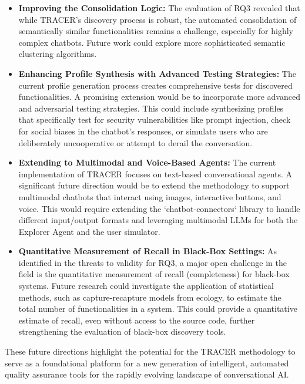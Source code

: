\begin{itemize}
    \item \textbf{Improving the Consolidation Logic:}
      The evaluation of RQ3 revealed that while TRACER's discovery process is robust,
      the automated consolidation of semantically similar functionalities remains a challenge,
      especially for highly complex chatbots.
      Future work could explore more sophisticated semantic clustering algorithms. 

    \item \textbf{Enhancing Profile Synthesis with Advanced Testing Strategies:}
      The current profile generation process creates comprehensive tests for discovered functionalities.
      A promising extension would be to incorporate more advanced and adversarial testing strategies.
      This could include synthesizing profiles that specifically test for security vulnerabilities like prompt injection,
      check for social biases in the chatbot's responses,
      or simulate users who are deliberately uncooperative or attempt to derail the conversation.

    \item \textbf{Extending to Multimodal and Voice-Based Agents:}
      The current implementation of \ac{TRACER} focuses on text-based conversational agents.
      A significant future direction would be
      to extend the methodology to support multimodal chatbots that interact using images, interactive buttons, and voice.
      This would require extending the `chatbot-connectors` library
      to handle different input/output formats
      and leveraging multimodal \acp{LLM} for both the Explorer Agent and the user simulator.

    \item \textbf{Quantitative Measurement of Recall in Black-Box Settings:}
      As identified in the threats to validity for RQ3,
      a major open challenge in the field is the quantitative measurement of recall (completeness) for black-box systems.
      Future research could investigate the application of statistical methods,
      such as capture-recapture models from ecology,
      to estimate the total number of functionalities in a system.
      This could provide a quantitative estimate of recall,
      even without access to the source code,
      further strengthening the evaluation of black-box discovery tools.
\end{itemize}

These future directions highlight the potential for the \ac{TRACER} methodology
to serve as a foundational platform
for a new generation of intelligent, automated quality assurance tools
for the rapidly evolving landscape of conversational AI.


